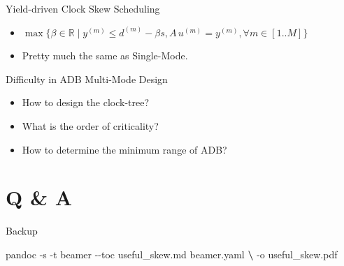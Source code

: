 \documentclass[
  ignorenonframetext,
]{beamer}
\newenvironment{Shaded}{}{}
\newcommand{\ExtensionTok}[1]{#1}
\newcommand{\KeywordTok}[1]{\textcolor[rgb]{0.00,0.44,0.13}{\textbf{#1}}}
\newcommand{\NormalTok}[1]{#1}
\providecommand{\tightlist}{%
  \setlength{\itemsep}{0pt}\setlength{\parskip}{0pt}}
\begin{document}
\begin{frame}{Yield-driven Clock Skew Scheduling}
\protect\hypertarget{yield-driven-clock-skew-scheduling-2}{}
\begin{itemize}
\tightlist
\item
  \(\max\{\beta \in \mathbb{R} \mid y^{(m)} \leq d^{(m)} - \beta s, A\,u^{(m)} = y^{(m)}, \forall m\in[1..M]\}\)
\item
  Pretty much the same as Single-Mode.
\end{itemize}
\end{frame}

\begin{frame}{Difficulty in ADB Multi-Mode Design}
\protect\hypertarget{difficulty-in-adb-multi-mode-design}{}
\begin{itemize}
\tightlist
\item
  How to design the clock-tree?
\item
  What is the order of criticality?
\item
  How to determine the minimum range of ADB?
\end{itemize}
\end{frame}

\begin{frame}
\end{frame}

\hypertarget{q-a}{%
\section{Q \& A}\label{q-a}}

\begin{frame}[fragile]{Backup}
\protect\hypertarget{backup}{}
\begin{Shaded}
\begin{Highlighting}[]
\ExtensionTok{pandoc}\NormalTok{ {-}s {-}t beamer {-}{-}toc useful\_skew.md beamer.yaml }\KeywordTok{\textbackslash{}}
       \ExtensionTok{{-}o}\NormalTok{ useful\_skew.pdf}
\end{Highlighting}
\end{Shaded}
\end{frame}
\end{document}
